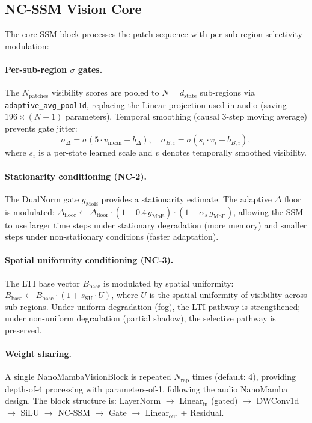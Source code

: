 \documentclass[10pt,twocolumn,letterpaper]{article}
\begin{document}
\subsection{NC-SSM Vision Core}

The core SSM block processes the patch sequence with per-sub-region selectivity modulation:

\paragraph{Per-sub-region $\sigma$ gates.}
The $N_{\text{patches}}$ visibility scores are pooled to $N = d_{\text{state}}$ sub-regions via \texttt{adaptive\_avg\_pool1d}, replacing the Linear projection used in audio (saving $196 \times (N+1)$ parameters).
Temporal smoothing (causal 3-step moving average) prevents gate jitter:
\begin{equation}
\sigma_{\Delta} = \sigma(5 \cdot \bar{v}_{\text{mean}} + b_{\Delta}), \quad
\sigma_{B,i} = \sigma(s_i \cdot \bar{v}_i + b_{B,i}),
\end{equation}
where $s_i$ is a per-state learned scale and $\bar{v}$ denotes temporally smoothed visibility.

\paragraph{Stationarity conditioning (NC-2).}
The DualNorm gate $g_{\text{MoE}}$ provides a stationarity estimate.
The adaptive $\Delta$ floor is modulated:
$\Delta_{\text{floor}} \leftarrow \Delta_{\text{floor}} \cdot (1 - 0.4 \, g_{\text{MoE}}) \cdot (1 + \alpha_s \, g_{\text{MoE}})$,
allowing the SSM to use larger time steps under stationary degradation (more memory) and smaller steps under non-stationary conditions (faster adaptation).

\paragraph{Spatial uniformity conditioning (NC-3).}
The LTI base vector $B_{\text{base}}$ is modulated by spatial uniformity:
$B_{\text{base}} \leftarrow B_{\text{base}} \cdot (1 + s_{\text{SU}} \cdot U)$,
where $U$ is the spatial uniformity of visibility across sub-regions.
Under uniform degradation (fog), the LTI pathway is strengthened; under non-uniform degradation (partial shadow), the selective pathway is preserved.

\paragraph{Weight sharing.}
A single NanoMambaVisionBlock is repeated $N_{\text{rep}}$ times (default: 4), providing depth-of-4 processing with parameters-of-1, following the audio NanoMamba design.
The block structure is: LayerNorm $\to$ Linear$_{\text{in}}$ (gated) $\to$ DWConv1d $\to$ SiLU $\to$ NC-SSM $\to$ Gate $\to$ Linear$_{\text{out}}$ + Residual.
\end{document}
